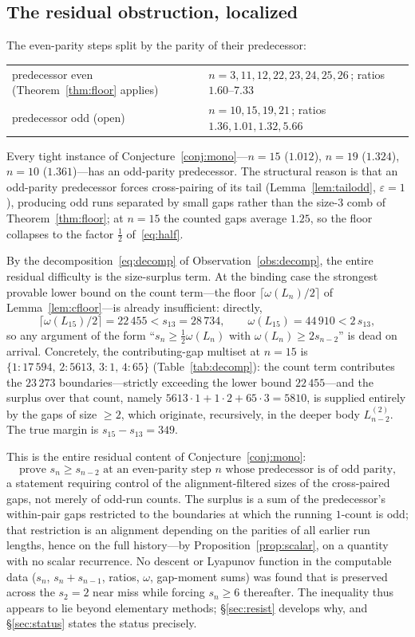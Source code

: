 \documentclass[11pt,reqno]{amsart}
\theoremstyle{plain}
\theoremstyle{definition}
\theoremstyle{remark}
\begin{document}
\subsection{The residual obstruction, localized}\label{sec:12.1}
The even-parity steps split by the parity of their predecessor:
\begin{center}
\begin{tabular}{ll}
predecessor even (Theorem~\ref{thm:floor} applies) & $n=3,11,12,22,23,24,25,26$\,; ratios $1.60$--$7.33$\\
predecessor odd (open) & $n=10,15,19,21$\,; ratios $1.36,1.01,1.32,5.66$
\end{tabular}
\end{center}
Every tight instance of Conjecture~\ref{conj:mono}---$n=15$ ($1.012$), $n=19$ ($1.324$), $n=10$ ($1.361$)---has an odd-parity predecessor. The structural reason is that an odd-parity predecessor forces cross-pairing of its tail (Lemma~\ref{lem:tailodd}, $\varepsilon=1$), producing odd runs separated by small gaps rather than the size-$3$ comb of Theorem~\ref{thm:floor}; at $n=15$ the counted gaps average $1.25$, so the floor collapses to the factor $\tfrac12$ of~\eqref{eq:half}.

By the decomposition~\eqref{eq:decomp} of Observation~\ref{obs:decomp}, the entire residual difficulty is the size-surplus term. At the binding case the strongest provable lower bound on the count term---the floor $\lceil\omega(L_n)/2\rceil$ of Lemma~\ref{lem:cfloor}---is already insufficient: directly,
\[ \lceil\omega(L_{15})/2\rceil=22\,455<s_{13}=28\,734,\qquad \omega(L_{15})=44\,910<2\,s_{13}, \]
so any argument of the form ``$s_n\ge\tfrac12\omega(L_n)$ with $\omega(L_n)\ge 2s_{n-2}$'' is dead on arrival. Concretely, the contributing-gap multiset at $n=15$ is $\{1:17\,594,\,2:5613,\,3:1,\,4:65\}$ (Table~\ref{tab:decomp}): the count term contributes the $23\,273$ boundaries---strictly exceeding the lower bound $22\,455$---and the surplus over that count, namely $5613\cdot 1+1\cdot 2+65\cdot 3=5810$, is supplied entirely by the gaps of size $\ge 2$, which originate, recursively, in the deeper body $L^{(2)}_{n-2}$. The true margin is $s_{15}-s_{13}=349$.

This is the entire residual content of Conjecture~\ref{conj:mono}:
\[ \text{prove }s_n\ge s_{n-2}\text{ at an even-parity step $n$ whose predecessor is of odd parity,} \]
a statement requiring control of the alignment-filtered sizes of the cross-paired gaps, not merely of odd-run counts. The surplus is a sum of the predecessor's within-pair gaps restricted to the boundaries at which the running $1$-count is odd; that restriction is an alignment depending on the parities of all earlier run lengths, hence on the full history---by Proposition~\ref{prop:scalar}, on a quantity with no scalar recurrence. No descent or Lyapunov function in the computable data ($s_n$, $s_n+s_{n-1}$, ratios, $\omega$, gap-moment sums) was found that is preserved across the $s_2=2$ near miss while forcing $s_n\ge 6$ thereafter. The inequality thus appears to lie beyond elementary methods; \S\ref{sec:resist} develops why, and \S\ref{sec:status} states the status precisely.
\end{document}
